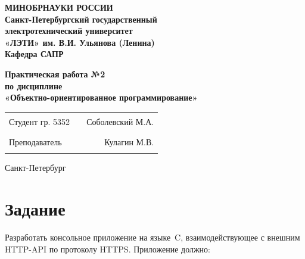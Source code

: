 \documentclass[12pt]{extarticle}
\begin{document}
\begin{center}
  \textbf{МИНОБРНАУКИ РОССИИ} \\
  \textbf{Санкт-Петербургский государственный} \\
  \textbf{электротехнический университет} \\
  \textbf{«ЛЭТИ» им. В.И. Ульянова (Ленина)} \\
  \textbf{Кафедра САПР} \\
\end{center}

\vspace{0.25\textheight}

\begin{center}
\textbf{Практическая работа №2} \\
\textbf{по дисциплине} \\
\textbf{«Объектно-ориентированное программирование»} \\
\end{center}

\vspace*{\fill}

\begin{center}
\begin{tabularx}{\textwidth}{ l X r }
 Студент гр. 5352 & \rule{8cm}{0.2mm} & Соболевский М.А. \\
 Преподаватель & \rule{8cm}{0.2mm} & Кулагин М.В. \\
\end{tabularx}
\end{center}

\vspace{3em}

\begin{center}
Санкт-Петербург\\
\the\year
\end{center}

\thispagestyle{empty}

\pagebreak

\section{Задание}

Разработать консольное приложение на языке~C, взаимодействующее с
внешним HTTP-API по протоколу HTTPS. Приложение должно:
\end{document}
